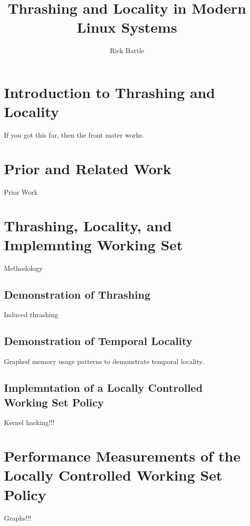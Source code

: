 \documentclass[twoside,thesis,twoadvisors]{npsreport}
\title{Thrashing and Locality in Modern Linux Systems}
\author{Rick Battle}
\begin{document}
\NPScover                       %
\NPSsftne                       %
\NPSthesistitle                 %
\NPSabstractpage                %
\NPSfrontmatter                 %


\renewcommand{\chaptermark}[1]{\markboth{\MakeUppercase{\chaptername}\ \thechapter.\ #1}{}}
\NPStableOfContents
\NPSlistOfFigures
\NPSlistOfTables



\NPSbody

\chapter{Introduction to Thrashing and Locality}

If you got this far, then the front mater works.

\chapter{Prior and Related Work}
Prior Work

\chapter{Thrashing, Locality, and Implemnting Working Set}
Methodology

\section{Demonstration of Thrashing}
Induced thrashing

\section{Demonstration of Temporal Locality}
Graphed memory usage patterns to demonstrate temporal locality.

\section{Implemntation of a Locally Controlled Working Set Policy}
Kernel hacking!!!

\chapter{Performance Measurements of the Locally Controlled Working Set Policy}
Graphs!!!
\end{document}
